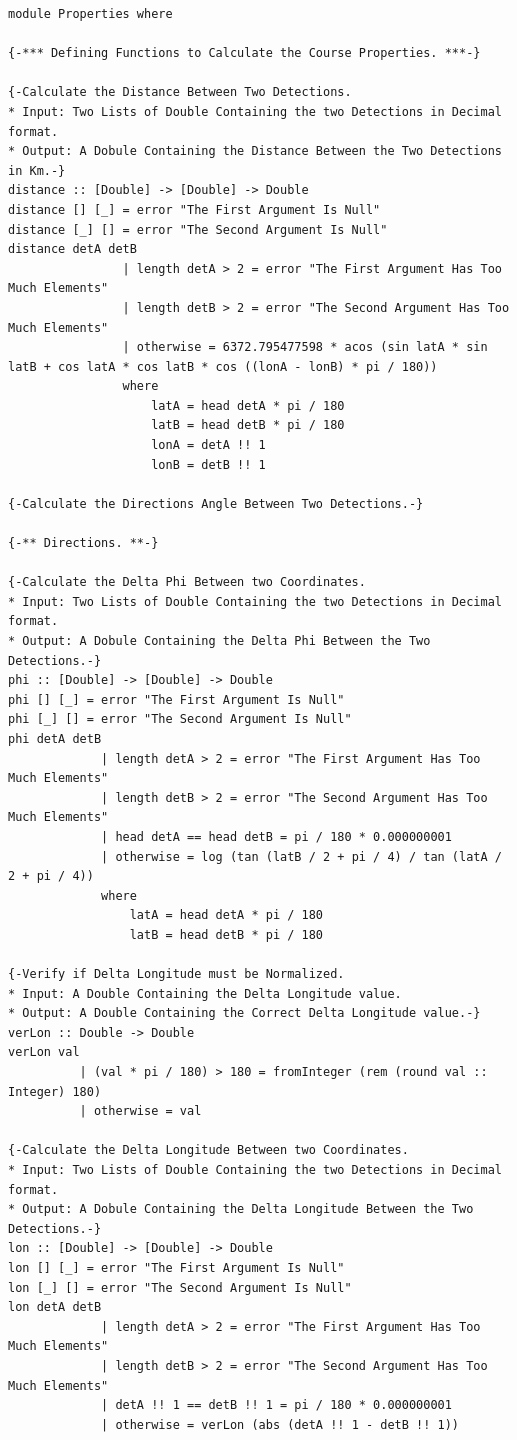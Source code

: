 \documentclass{article}
\begin{document}
\begin{lstlisting}
module Properties where

{-*** Defining Functions to Calculate the Course Properties. ***-}

{-Calculate the Distance Between Two Detections.
* Input: Two Lists of Double Containing the two Detections in Decimal format.
* Output: A Dobule Containing the Distance Between the Two Detections in Km.-}
distance :: [Double] -> [Double] -> Double 
distance [] [_] = error "The First Argument Is Null"
distance [_] [] = error "The Second Argument Is Null"
distance detA detB
                | length detA > 2 = error "The First Argument Has Too Much Elements"
                | length detB > 2 = error "The Second Argument Has Too Much Elements"
                | otherwise = 6372.795477598 * acos (sin latA * sin latB + cos latA * cos latB * cos ((lonA - lonB) * pi / 180))
                where
                    latA = head detA * pi / 180
                    latB = head detB * pi / 180
                    lonA = detA !! 1
                    lonB = detB !! 1

{-Calculate the Directions Angle Between Two Detections.-}

{-** Directions. **-}

{-Calculate the Delta Phi Between two Coordinates.
* Input: Two Lists of Double Containing the two Detections in Decimal format.
* Output: A Dobule Containing the Delta Phi Between the Two Detections.-}
phi :: [Double] -> [Double] -> Double 
phi [] [_] = error "The First Argument Is Null"
phi [_] [] = error "The Second Argument Is Null"
phi detA detB 
             | length detA > 2 = error "The First Argument Has Too Much Elements"
             | length detB > 2 = error "The Second Argument Has Too Much Elements"
             | head detA == head detB = pi / 180 * 0.000000001
             | otherwise = log (tan (latB / 2 + pi / 4) / tan (latA / 2 + pi / 4))
             where
                 latA = head detA * pi / 180
                 latB = head detB * pi / 180

{-Verify if Delta Longitude must be Normalized.
* Input: A Double Containing the Delta Longitude value.
* Output: A Double Containing the Correct Delta Longitude value.-}
verLon :: Double -> Double 
verLon val
          | (val * pi / 180) > 180 = fromInteger (rem (round val :: Integer) 180)   
          | otherwise = val

{-Calculate the Delta Longitude Between two Coordinates.
* Input: Two Lists of Double Containing the two Detections in Decimal format.
* Output: A Dobule Containing the Delta Longitude Between the Two Detections.-}
lon :: [Double] -> [Double] -> Double
lon [] [_] = error "The First Argument Is Null"
lon [_] [] = error "The Second Argument Is Null"
lon detA detB
             | length detA > 2 = error "The First Argument Has Too Much Elements"
             | length detB > 2 = error "The Second Argument Has Too Much Elements"
             | detA !! 1 == detB !! 1 = pi / 180 * 0.000000001
             | otherwise = verLon (abs (detA !! 1 - detB !! 1)) 


\end{lstlisting}
\end{document}
